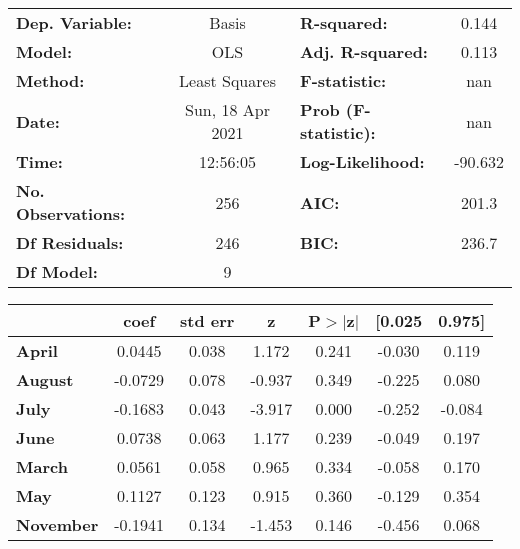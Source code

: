 \begin{center}
\begin{tabular}{lclc}
\toprule
\textbf{Dep. Variable:}    &      Basis       & \textbf{  R-squared:         } &     0.144   \\
\textbf{Model:}            &       OLS        & \textbf{  Adj. R-squared:    } &     0.113   \\
\textbf{Method:}           &  Least Squares   & \textbf{  F-statistic:       } &       nan   \\
\textbf{Date:}             & Sun, 18 Apr 2021 & \textbf{  Prob (F-statistic):} &      nan    \\
\textbf{Time:}             &     12:56:05     & \textbf{  Log-Likelihood:    } &   -90.632   \\
\textbf{No. Observations:} &         256      & \textbf{  AIC:               } &     201.3   \\
\textbf{Df Residuals:}     &         246      & \textbf{  BIC:               } &     236.7   \\
\textbf{Df Model:}         &           9      & \textbf{                     } &             \\
\bottomrule
\end{tabular}
\begin{tabular}{lcccccc}
                   & \textbf{coef} & \textbf{std err} & \textbf{z} & \textbf{P$> |$z$|$} & \textbf{[0.025} & \textbf{0.975]}  \\
\midrule
\textbf{April}     &       0.0445  &        0.038     &     1.172  &         0.241        &       -0.030    &        0.119     \\
\textbf{August}    &      -0.0729  &        0.078     &    -0.937  &         0.349        &       -0.225    &        0.080     \\
\textbf{July}      &      -0.1683  &        0.043     &    -3.917  &         0.000        &       -0.252    &       -0.084     \\
\textbf{June}      &       0.0738  &        0.063     &     1.177  &         0.239        &       -0.049    &        0.197     \\
\textbf{March}     &       0.0561  &        0.058     &     0.965  &         0.334        &       -0.058    &        0.170     \\
\textbf{May}       &       0.1127  &        0.123     &     0.915  &         0.360        &       -0.129    &        0.354     \\
\textbf{November}  &      -0.1941  &        0.134     &    -1.453  &         0.146        &       -0.456    &        0.068     \\

\end{tabular}
\end{center}
